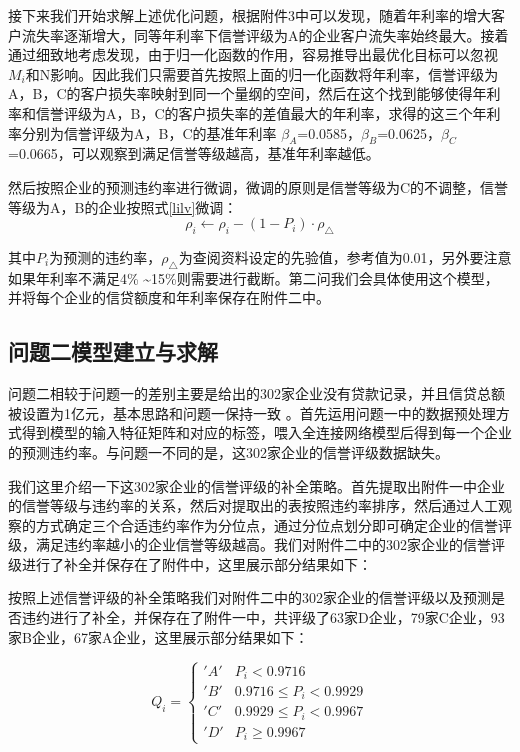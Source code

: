 \documentclass{cumcmthesis}
\begin{document}
接下来我们开始求解上述优化问题，根据附件3中可以发现，随着年利率的增大客户流失率逐渐增大，同等年利率下信誉评级为A的企业客户流失率始终最大。接着通过细致地考虑发现，由于归一化函数的作用，容易推导出最优化目标可以忽视$M_i$和N影响。因此我们只需要首先按照上面的归一化函数将年利率，信誉评级为A，B，C的客户损失率映射到同一个量纲的空间，然后在这个找到能够使得年利率和信誉评级为A，B，C的客户损失率的差值最大的年利率，求得的这三个年利率分别为信誉评级为A，B，C的基准年利率
$\beta_A$=0.0585，$\beta_B$=0.0625，$\beta_C$=0.0665，可以观察到满足信誉等级越高，基准年利率越低。

然后按照企业的预测违约率进行微调，微调的原则是信誉等级为C的不调整，信誉等级为A，B的企业按照式\ref{lilv}微调：
\begin{equation}
    \rho_i \gets \rho_i - (1 - P_i) \cdot \rho_\triangle
    \label{lilv}
\end{equation}

其中$P_i$为预测的违约率，$\rho_\triangle$为查阅资料设定的先验值，参考值为0.01，另外要注意如果年利率不满足4\% \textasciitilde 15\%则需要进行截断。第二问我们会具体使用这个模型，并将每个企业的信贷额度和年利率保存在附件二中。

\subsection{问题二模型建立与求解}
问题二相较于问题一的差别主要是给出的302家企业没有贷款记录，并且信贷总额被设置为1亿元，基本思路和问题一保持一致 。首先运用问题一中的数据预处理方式得到模型的输入特征矩阵和对应的标签，喂入全连接网络模型后得到每一个企业的预测违约率。与问题一不同的是，这302家企业的信誉评级数据缺失。

我们这里介绍一下这302家企业的信誉评级的补全策略。首先提取出附件一中企业的信誉等级与违约率的关系，然后对提取出的表按照违约率排序，然后通过人工观察的方式确定三个合适违约率作为分位点，通过分位点划分即可确定企业的信誉评级，满足违约率越小的企业信誉等级越高。我们对附件二中的302家企业的信誉评级进行了补全并保存在了附件中，这里展示部分结果如下：

按照上述信誉评级的补全策略我们对附件二中的302家企业的信誉评级以及预测是否违约进行了补全，并保存在了附件一中，共评级了63家D企业，79家C企业，93家B企业，67家A企业，这里展示部分结果如下：

\begin{equation}
    Q_i = 
    \begin{cases}
        'A' & P_i < 0.9716 \\
        'B' & 0.9716 \leq P_i < 0.9929 \\
        'C' & 0.9929 \leq P_i < 0.9967 \\
        'D' & P_i \geq 0.9967
    \end{cases}
\end{equation}
\end{document}
